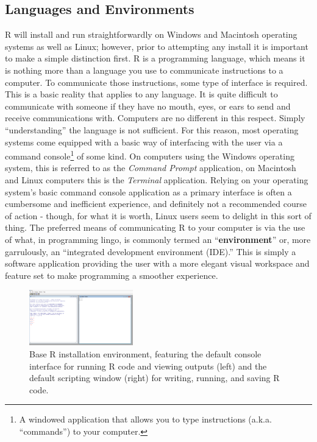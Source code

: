 \subsection{Languages and Environments}
\label{sec:LangAndEnv}

R will install and run straightforwardly on Windows and Macintosh operating systems as well as Linux; however, prior to attempting any install it is important to make a simple distinction first.  R is a programming language, which means it is nothing more than a language you use to communicate instructions to a computer. To communicate those instructions, some type of interface is required.  This is a basic reality that applies to any language.  It is quite difficult to communicate with someone if they have no mouth, eyes, or ears to send and receive communications with. Computers are no different in this respect. Simply ``understanding'' the language is not sufficient.  For this reason, most operating systems come equipped with a basic way of interfacing with the user via a \gls{command console}\footnote{A windowed application that allows you to type instructions (a.k.a. ``commands'') to your computer.} of some kind. On computers using the Windows operating system, this is referred to as the \textit{Command Prompt} application, on Macintosh and Linux computers this is the \textit{Terminal} application. Relying on your operating system's basic command console application as a primary interface is often a cumbersome and inefficient experience, and definitely not a recommended course of action - though, for what it is worth, Linux users seem to delight in this sort of thing. The preferred means of communicating R to your computer is via the use of what, in programming lingo, is commonly termed an ``\textbf{environment}'' or, more garrulously, an ``\gls{integrated development environment} (\acrshort{IDE}).''  This is simply a software application providing the user with a more elegant visual workspace and feature set to make programming a smoother experience. 

\begin{figure}
  \begin{center}
    \includegraphics[width=0.4\textwidth]{graphics/ch1Figs/base_R_env.pdf}
  \end{center}
    \caption{Base R installation environment, featuring the default console interface for running R code and viewing outputs (left) and the default scripting window (right) for writing, running, and saving R code.}
    \label{fig:base_R}
\end{figure}

